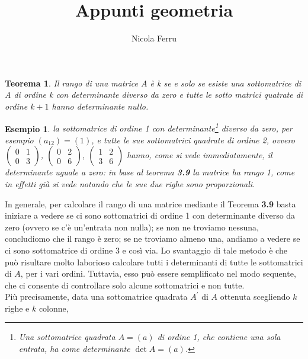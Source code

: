 \documentclass{book}
\title{Appunti geometria}
\author{Nicola Ferru}
\newtheorem{teorema}{Teorema}
\newtheorem{esempio}{Esempio}
\begin{document}
\maketitle
\tableofcontents
\listoftables
\listoffigures





\begin{teorema}\label{3.9}
  Il rango di una matrice $A$ è k se e solo se esiste una sottomatrice di A di ordine k con determinante diverso
  da zero e tutte le sotto matrici quatrate di ordine $k+1$ hanno determinante nullo. 
\end{teorema}
\begin{esempio}
    la sottomatrice di ordine 1 con determinante\footnote{Una sottomatrice quadrata $A=(a)$
      di ordine 1, che contiene una sola entrata, ha come determinante $\det A=(a)$.} diverso da zero, per esempio
    $(a_{12})=(1)$, e tutte le sue sottomatrici quadrate di ordine 2, ovvero $
    \begin{pmatrix}
      0 & 1\\
      0 & 3
    \end{pmatrix}
    $,
    $
    \begin{pmatrix}
      0 &2 \\
      0 & 6
    \end{pmatrix}
    $, $
    \begin{pmatrix}
      1 &2\\
      3 & 6
    \end{pmatrix}
    $ hanno, come si vede immediatamente, il determinante uguale a zero: in base al teorema \textbf{3.9} la
    matrice ha rango 1, come in effetti già si vede notando che le sue due righe sono proporzionali.
\end{esempio}
In generale, per calcolare il rango di una matrice mediante il Teorema \textbf{3.9} basta iniziare a vedere se ci
sono sottomatrici di ordine 1 con determinante diverso da zero (ovvero se c'è un'entrata non nulla); se non ne
troviamo nessuna, concludiomo che il rango è zero; se ne troviamo almeno una, andiamo a vedere se ci sono
sottomatrice di ordine 3 e così via. Lo svantaggio di tale metodo è che può risultare molto laborioso calcolare
tutti i determinanti di tutte le sottomatrici di $A$, per i vari ordini. Tuttavia, esso può essere semplificato
nel modo sequente, che ci consente di controllare solo alcune sottomatrici e non tutte.\\
Più precisamente, data una sottomatrice quadrata $A^\prime$ di $A$ ottenuta scegliendo $k$ righe e $k$ colonne,
\end{document}
